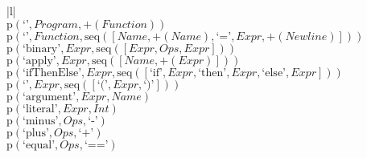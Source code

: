 \footnotesize\begin{center}\begin{tabular}{|l|}\hline
{}
\\\hline
$\mathrm{p}(\text{`'},\mathit{Program},\plus \left(\mathit{Function}\right))$	\\
$\mathrm{p}(\text{`'},\mathit{Function},\mathrm{seq}\left(\left[\mathit{Name}, \plus \left(\mathit{Name}\right), \text{`='}, \mathit{Expr}, \plus \left(\mathit{Newline}\right)\right]\right))$	\\
$\mathrm{p}(\text{`binary'},\mathit{Expr},\mathrm{seq}\left(\left[\mathit{Expr}, \mathit{Ops}, \mathit{Expr}\right]\right))$	\\
$\mathrm{p}(\text{`apply'},\mathit{Expr},\mathrm{seq}\left(\left[\mathit{Name}, \plus \left(\mathit{Expr}\right)\right]\right))$	\\
$\mathrm{p}(\text{`ifThenElse'},\mathit{Expr},\mathrm{seq}\left(\left[\text{`if'}, \mathit{Expr}, \text{`then'}, \mathit{Expr}, \text{`else'}, \mathit{Expr}\right]\right))$	\\
$\mathrm{p}(\text{`'},\mathit{Expr},\mathrm{seq}\left(\left[\text{`('}, \mathit{Expr}, \text{`)'}\right]\right))$	\\
$\mathrm{p}(\text{`argument'},\mathit{Expr},\mathit{Name})$	\\
$\mathrm{p}(\text{`literal'},\mathit{Expr},\mathit{Int})$	\\
$\mathrm{p}(\text{`minus'},\mathit{Ops},\text{`-'})$	\\
$\mathrm{p}(\text{`plus'},\mathit{Ops},\text{`+'})$	\\
$\mathrm{p}(\text{`equal'},\mathit{Ops},\text{`=='})$	\\
\hline\end{tabular}\end{center}



